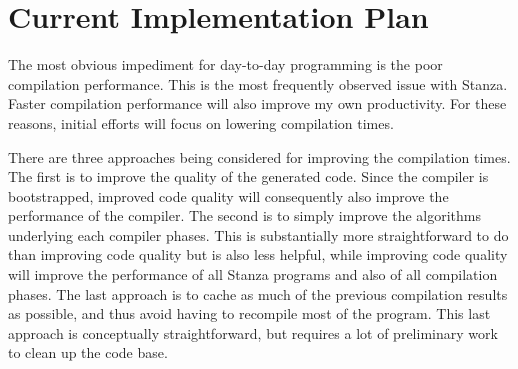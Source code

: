 \documentclass[fleqn, 12pt]{article}
\begin{document}
\section{Current Implementation Plan}
The most obvious impediment for day-to-day programming is the poor compilation performance. This is the most frequently observed issue with Stanza. Faster compilation performance will also improve my own productivity. For these reasons, initial efforts will focus on lowering compilation times.

There are three approaches being considered for improving the compilation times. The first is to improve the quality of the generated code. Since the compiler is bootstrapped, improved code quality will consequently also improve the performance of the compiler. The second is to simply improve the algorithms underlying each compiler phases. This is substantially more straightforward to do than improving code quality but is also less helpful, while improving code quality will improve the performance of all Stanza programs and also of all compilation phases. The last approach is to cache as much of the previous compilation results as possible, and thus avoid having to recompile most of the program. This last approach is conceptually straightforward, but requires a lot of preliminary work to clean up the code base. 
\end{document}
